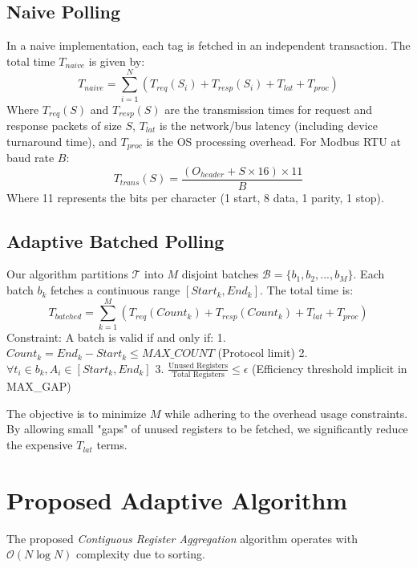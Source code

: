 \documentclass[journal]{IEEEtran}
\begin{document}
\subsection{Naive Polling}
In a naive implementation, each tag is fetched in an independent transaction. The total time $T_{naive}$ is given by:
\begin{equation}
T_{naive} = \sum_{i=1}^{N} (T_{req}(S_i) + T_{resp}(S_i) + T_{lat} + T_{proc})
\end{equation}
Where $T_{req}(S)$ and $T_{resp}(S)$ are the transmission times for request and response packets of size $S$, $T_{lat}$ is the network/bus latency (including device turnaround time), and $T_{proc}$ is the OS processing overhead.
For Modbus RTU at baud rate $B$:
\begin{equation}
T_{trans}(S) = \frac{(O_{header} + S \times 16) \times 11}{B}
\end{equation}
Where 11 represents the bits per character (1 start, 8 data, 1 parity, 1 stop).

\subsection{Adaptive Batched Polling}
Our algorithm partitions $\mathcal{T}$ into $M$ disjoint batches $\mathcal{B} = \{b_1, b_2, ..., b_M\}$. Each batch $b_k$ fetches a continuous range $[Start_k, End_k]$. The total time is:
\begin{equation}
T_{batched} = \sum_{k=1}^{M} (T_{req}(Count_k) + T_{resp}(Count_k) + T_{lat} + T_{proc})
\end{equation}
Constraint: A batch is valid if and only if:
1. $Count_k = End_k - Start_k \leq MAX\_COUNT$ (Protocol limit)
2. $\forall t_i \in b_k, A_i \in [Start_k, End_k]$
3. $\frac{\text{Unused Registers}}{\text{Total Registers}} \leq \epsilon$ (Efficiency threshold implicit in MAX\_GAP)

The objective is to minimize $M$ while adhering to the overhead usage constraints. By allowing small "gaps" of unused registers to be fetched, we significantly reduce the expensive $T_{lat}$ terms.

\section{Proposed Adaptive Algorithm}
The proposed \textit{Contiguous Register Aggregation} algorithm operates with $\mathcal{O}(N \log N)$ complexity due to sorting.
\end{document}
